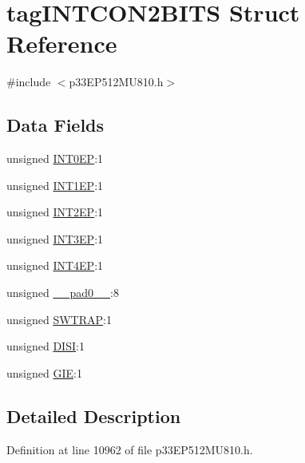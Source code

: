 \hypertarget{structtag_i_n_t_c_o_n2_b_i_t_s}{}\section{tag\+I\+N\+T\+C\+O\+N2\+B\+I\+TS Struct Reference}
\label{structtag_i_n_t_c_o_n2_b_i_t_s}


{\ttfamily \#include $<$p33\+E\+P512\+M\+U810.\+h$>$}

\subsection*{Data Fields}
\begin{DoxyCompactItemize}
\item 
unsigned \hyperlink{structtag_i_n_t_c_o_n2_b_i_t_s_a4a27565329367916033134c939a4b7d7}{I\+N\+T0\+EP}\+:1
\item 
unsigned \hyperlink{structtag_i_n_t_c_o_n2_b_i_t_s_ac12dc09bfaab551804aaf73ddde338a3}{I\+N\+T1\+EP}\+:1
\item 
unsigned \hyperlink{structtag_i_n_t_c_o_n2_b_i_t_s_a9fb601cfb991e74c96d6b100b8d1fd2d}{I\+N\+T2\+EP}\+:1
\item 
unsigned \hyperlink{structtag_i_n_t_c_o_n2_b_i_t_s_a0c8f84dd6b1fa46cda281b2b97b4fb85}{I\+N\+T3\+EP}\+:1
\item 
unsigned \hyperlink{structtag_i_n_t_c_o_n2_b_i_t_s_a21ab2b68eea317962ade11b4e72dd387}{I\+N\+T4\+EP}\+:1
\item 
unsigned \hyperlink{structtag_i_n_t_c_o_n2_b_i_t_s_adf71f3d8410c1f1dbbc96680a92c49af}{\+\_\+\+\_\+pad0\+\_\+\+\_\+}\+:8
\item 
unsigned \hyperlink{structtag_i_n_t_c_o_n2_b_i_t_s_a728f320cf11d94553e11df9e9a1dc0db}{S\+W\+T\+R\+AP}\+:1
\item 
unsigned \hyperlink{structtag_i_n_t_c_o_n2_b_i_t_s_a91cfcbd4838528d6532bf4bd03dd1f5e}{D\+I\+SI}\+:1
\item 
unsigned \hyperlink{structtag_i_n_t_c_o_n2_b_i_t_s_a3e0353177df4a5af6f7c65625561311a}{G\+IE}\+:1
\end{DoxyCompactItemize}


\subsection{Detailed Description}


Definition at line 10962 of file p33\+E\+P512\+M\+U810.\+h.



